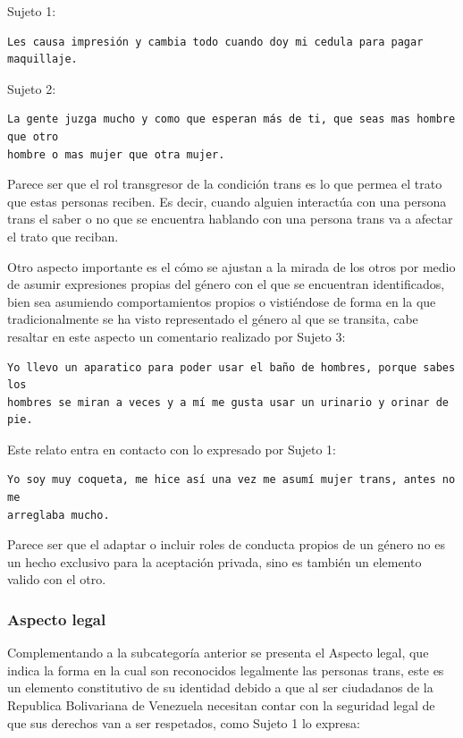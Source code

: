 Sujeto 1:

\begin{verbatim}
Les causa impresión y cambia todo cuando doy mi cedula para pagar maquillaje.
\end{verbatim}

Sujeto 2:

\begin{verbatim}
La gente juzga mucho y como que esperan más de ti, que seas mas hombre que otro
hombre o mas mujer que otra mujer.
\end{verbatim}

Parece ser que el rol transgresor de la condición trans es lo que permea el
trato que estas personas reciben. Es decir, cuando alguien interactúa con una
persona trans el saber o no que se encuentra hablando con una persona trans va a
afectar el trato que reciban.

Otro aspecto importante es el cómo se ajustan a la mirada de los otros por medio
de asumir  expresiones propias del género con el que se encuentran
identificados, bien sea asumiendo comportamientos propios o vistiéndose de forma
en la que tradicionalmente se ha visto representado el género al que se
transita, cabe resaltar en este aspecto un comentario realizado por Sujeto 3:

\begin{verbatim}
Yo llevo un aparatico para poder usar el baño de hombres, porque sabes los
hombres se miran a veces y a mí me gusta usar un urinario y orinar de pie.
\end{verbatim}

Este relato entra en contacto con lo expresado por Sujeto 1:

\begin{verbatim}
Yo soy muy coqueta, me hice así una vez me asumí mujer trans, antes no me
arreglaba mucho.
\end{verbatim}

Parece ser que el adaptar o incluir roles de conducta propios de un género no es
un hecho exclusivo para la aceptación privada, sino es también un elemento
valido con el otro.

\subsubsection{Aspecto legal}

Complementando a la subcategoría anterior se presenta el Aspecto legal, que
indica la forma en la cual son reconocidos legalmente las personas trans, este
es un elemento constitutivo de su identidad debido a que al ser ciudadanos de la
Republica Bolivariana de Venezuela necesitan contar con la seguridad legal de
que sus derechos van a ser respetados, como Sujeto 1 lo expresa:

